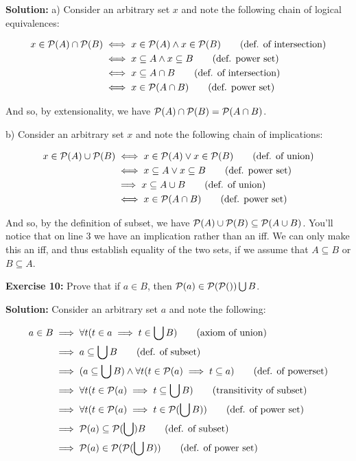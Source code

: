 \documentclass{article}
\begin{document}
\noindent\textbf{Solution:} a) Consider an arbitrary set $x$ and note the following chain of logical equivalences:

\begin{align*}
    x\in\mathcal P(A)\cap\mathcal P(B)&\iff x\in \mathcal P(A) \wedge x\in\mathcal P(B)\tag{def. of intersection}\\
    &\iff x\subseteq A\wedge x\subseteq B\tag{def. power set}\\
    &\iff x\subseteq A\cap B\tag{def. of intersection}\\
    &\iff x\in\mathcal P(A\cap B)\tag{def. power set}
\end{align*}



And so, by extensionality, we have $\mathcal P(A)\cap\mathcal P(B)=\mathcal P(A\cap B)$.

b) Consider an arbitrary set $x$ and note the following chain of implications:

\begin{align*}
    x\in\mathcal P(A)\cup\mathcal P(B)&\iff x\in \mathcal P(A) \vee x\in\mathcal P(B)\tag{def. of union}\\
    &\iff x\subseteq A\vee x\subseteq B\tag{def. power set}\\
    &\implies x\subseteq A\cup B\tag{def. of union}\\
    &\iff x\in\mathcal P(A\cap B)\tag{def. power set}
\end{align*}

And so, by the definition of subset, we have $\mathcal P(A)\cup\mathcal P(B)\subseteq\mathcal P(A\cup B)$. You'll notice that on line 3 we have an implication rather than an iff. We can only make this an iff, and thus establish equality of the two sets, if we assume that $A\subseteq B$ or $B\subseteq A$.
\bigskip

\noindent\textbf{Exercise 10:} Prove that if $a\in B$, then $\mathcal P(a)\in \mathcal P(\mathcal P())\bigcup B$.
\bigskip

\noindent\textbf{Solution:} Consider an arbitrary set $a$ and note the following:

\begin{align*}
    a\in B&\implies\forall t(t\in a\implies t\in\bigcup B)\tag{axiom of union}\\
    &\implies a\subseteq\bigcup B\tag{def. of subset}\\
    &\implies(a\subseteq\bigcup B)\wedge\forall t(t\in\mathcal P(a)\implies t\subseteq a)\tag{def. of powerset}\\
    &\implies\forall t(t\in\mathcal P(a)\implies t\subseteq\bigcup B)\tag{transitivity of subset}\\
    &\implies\forall t(t\in\mathcal P(a)\implies t\in\mathcal P(\bigcup B))\tag{def. of power set}\\
    &\implies \mathcal P(a)\subseteq \mathcal P(\bigcup) B\tag{def. of subset}\\
    &\implies \mathcal P(a)\in \mathcal P(\mathcal P(\bigcup B))\tag{def. of power set}\\
\end{align*}
\end{document}
